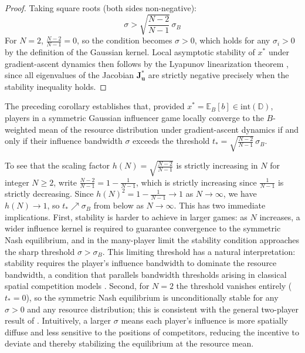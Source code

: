 \documentclass{article}
\begin{document}
\begin{proof}
                Taking square roots (both sides non-negative):
                \begin{equation}
                    \sigma > \sqrt{\frac{N-2}{N-1}}\,\sigma_B
                \end{equation}
                For $N=2$, $\frac{N-2}{N-1} = 0$, so the condition becomes $\sigma > 0$, 
                which holds for any $\sigma_i > 0$ by the definition of the Gaussian kernel. Local asymptotic stability of $x^*$ under gradient-ascent dynamics then follows by the Lyapunov linearization theorem \cite[Thm.~1 §8.4]{hirsch2013differential}, since all eigenvalues of the Jacobian $\mathbf{J}_{\mathbf{u}}^*$ are strictly negative precisely when the stability inequality holds.
            \end{proof}
            The preceding corollary establishes that, provided $x^* = \mathbb{E}_B[b] \in \mathrm{int}(\mathbb{D})$, players in a symmetric Gaussian influencer game locally converge to the $B$-weighted mean of the resource distribution under gradient-ascent dynamics if and only if their influence bandwidth $\sigma$ exceeds the threshold $t_* = \sqrt{\frac{N-2}{N-1}}\,\sigma_B$.

            To see that the scaling factor $h(N) = \sqrt{\frac{N-2}{N-1}}$ is strictly increasing in $N$ for integer $N \geq 2$, write $\frac{N-2}{N-1} = 1 - \frac{1}{N-1}$, which is strictly increasing since $\frac{1}{N-1}$ is strictly decreasing. Since $h(N)^2 = 1 - \frac{1}{N-1} \to 1$ as $N\to\infty$, we have $h(N) \to 1$, so $t_* \nearrow \sigma_B$ from below as $N\to\infty$. This has two immediate implications. First, stability is harder to achieve in larger games: as $N$ increases, a wider influence kernel is required to guarantee convergence to the symmetric Nash equilibrium, and in the many-player limit the stability condition approaches the sharp threshold $\sigma > \sigma_B$. This limiting threshold has a natural interpretation: stability requires the player's influence bandwidth to dominate the resource bandwidth, a condition that parallels bandwidth thresholds arising in classical spatial competition models \cite{hotelling1929stability,drezner2024competitive}. Second, for $N=2$ the threshold vanishes entirely ($t_* = 0$), so the symmetric Nash equilibrium is unconditionally stable for any $\sigma > 0$ and any resource distribution; this is consistent with the general two-player result of . Intuitively, a larger $\sigma$ means each player's influence is more spatially diffuse and less sensitive to the positions of competitors, reducing the incentive to deviate and thereby stabilizing the equilibrium at the resource mean.
\end{document}
